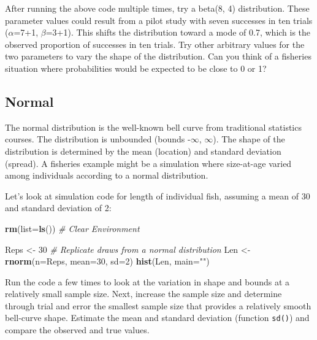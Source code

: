 \documentclass[
]{krantz}
\makeatletter
\newenvironment{Shaded}{\begin{snugshade}}{\end{snugshade}}
\newcommand{\AttributeTok}[1]{\textcolor[rgb]{0.27,0.27,0.27}{#1}}
\newcommand{\CommentTok}[1]{\textcolor[rgb]{0.37,0.37,0.37}{\textit{#1}}}
\newcommand{\DecValTok}[1]{\textcolor[rgb]{0.06,0.06,0.06}{#1}}
\newcommand{\FunctionTok}[1]{\textcolor[rgb]{0.27,0.27,0.27}{\textbf{#1}}}
\newcommand{\NormalTok}[1]{#1}
\newcommand{\OtherTok}[1]{\textcolor[rgb]{0.37,0.37,0.37}{#1}}
\newcommand{\StringTok}[1]{\textcolor[rgb]{0.5,0.5,0.5}{#1}}
\newenvironment{kframe}{%
\medskip{}
\setlength{\fboxsep}{.8em}
 \def\at@end@of@kframe{}%
 \ifinner\ifhmode%
  \def\at@end@of@kframe{\end{minipage}}%
  \begin{minipage}{\columnwidth}%
 \fi\fi%
 \def\FrameCommand##1{\hskip\@totalleftmargin \hskip-\fboxsep
 \colorbox{shadecolor}{##1}\hskip-\fboxsep
     \hskip-\linewidth \hskip-\@totalleftmargin \hskip\columnwidth}%
 \MakeFramed {\advance\hsize-\width
   \@totalleftmargin\z@ \linewidth\hsize
   \@setminipage}}%
 {\par\unskip\endMakeFramed%
 \at@end@of@kframe}
\renewenvironment{Shaded}{\begin{kframe}}{\end{kframe}}
\makeatother
\begin{document}
After running the above code multiple times, try a beta(8, 4) distribution. These parameter values could result from a pilot study with seven successes in ten trials (\(\alpha\)=7+1, \(\beta\)=3+1). This shifts the distribution toward a mode of 0.7, which is the observed proportion of successes in ten trials. Try other arbitrary values for the two parameters to vary the shape of the distribution. Can you think of a fisheries situation where probabilities would be expected to be close to 0 or 1?

\hypertarget{NormalDist}{%
\subsection{Normal}\label{NormalDist}}

The normal distribution is the well-known bell curve from traditional statistics courses. The distribution is unbounded (bounds -\(\infty\), \(\infty\)). The shape of the distribution is determined by the mean (location) and standard deviation (spread). A fisheries example might be a simulation where size-at-age varied among individuals according to a normal distribution.

Let's look at simulation code for length of individual fish, assuming a mean of 30 and standard deviation of 2:

\begin{Shaded}
\begin{Highlighting}[]
\FunctionTok{rm}\NormalTok{(}\AttributeTok{list=}\FunctionTok{ls}\NormalTok{()) }\CommentTok{\# Clear Environment}

\NormalTok{Reps }\OtherTok{\textless{}{-}} \DecValTok{30} \CommentTok{\# Replicate draws from a normal distribution}
\NormalTok{Len }\OtherTok{\textless{}{-}} \FunctionTok{rnorm}\NormalTok{(}\AttributeTok{n=}\NormalTok{Reps, }\AttributeTok{mean=}\DecValTok{30}\NormalTok{, }\AttributeTok{sd=}\DecValTok{2}\NormalTok{)}
\FunctionTok{hist}\NormalTok{(Len, }\AttributeTok{main=}\StringTok{""}\NormalTok{)}
\end{Highlighting}
\end{Shaded}

Run the code a few times to look at the variation in shape and bounds at a relatively small sample size. Next, increase the sample size and determine through trial and error the smallest sample size that provides a relatively smooth bell-curve shape. Estimate the mean and standard deviation (function \texttt{sd()}) and compare the observed and true values.
\end{document}
